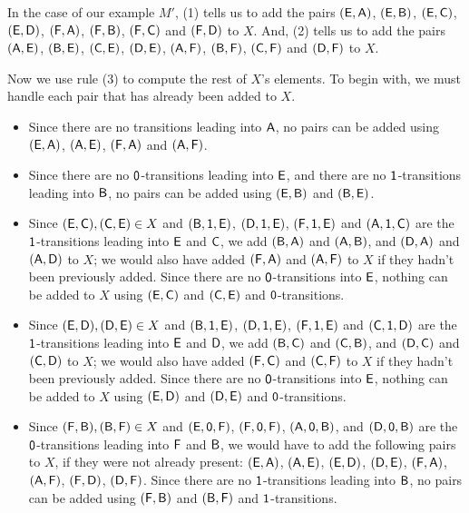 In the case of our example $M'$, (1) tells us to add the pairs
$(\mathsf{E},\mathsf{A})$, $(\mathsf{E},\mathsf{B})$, $(\mathsf{E},\mathsf{C})$, $(\mathsf{E},\mathsf{D})$,
$(\mathsf{F},\mathsf{A})$, $(\mathsf{F},\mathsf{B})$, $(\mathsf{F},\mathsf{C})$ and $(\mathsf{F},\mathsf{D})$ to $X$.
And, (2) tells us to add the pairs $(\mathsf{A},\mathsf{E})$, $(\mathsf{B},\mathsf{E})$,
$(\mathsf{C},\mathsf{E})$, $(\mathsf{D},\mathsf{E})$, $(\mathsf{A},\mathsf{F})$, $(\mathsf{B},\mathsf{F})$,
$(\mathsf{C},\mathsf{F})$ and $(\mathsf{D},\mathsf{F})$ to $X$.

Now we use rule (3) to compute the rest of $X$'s elements.  To begin
with, we must handle each pair that has already been added to $X$.
\begin{itemize}
\item Since there are no transitions leading into $\mathsf{A}$, no pairs can
  be added using $(\mathsf{E},\mathsf{A})$, $(\mathsf{A},\mathsf{E})$, $(\mathsf{F},\mathsf{A})$ and
  $(\mathsf{A},\mathsf{F})$.

\item Since there are no $\mathsf{0}$-transitions leading into $\mathsf{E}$,
  and there are no $\mathsf{1}$-transitions leading into $\mathsf{B}$, no pairs
  can be added using $(\mathsf{E},\mathsf{B})$ and $(\mathsf{B},\mathsf{E})$.

\item Since $(\mathsf{E},\mathsf{C}),(\mathsf{C},\mathsf{E})\in X$ and $(\mathsf{B},\mathsf{1},\mathsf{E})$,
  $(\mathsf{D},\mathsf{1},\mathsf{E})$, $(\mathsf{F},\mathsf{1},\mathsf{E})$ and $(\mathsf{A},\mathsf{1},\mathsf{C})$
  are the $\mathsf{1}$-transitions leading into $\mathsf{E}$ and $\mathsf{C}$, we add
  {$(\mathsf{B},\mathsf{A})$ and $(\mathsf{A},\mathsf{B})$, and $(\mathsf{D},\mathsf{A})$ and
    $(\mathsf{A},\mathsf{D})$} to $X$; {we would also have added $(\mathsf{F},\mathsf{A})$ and
    $(\mathsf{A},\mathsf{F})$ to $X$ if they hadn't been previously added.}  Since
  there are no $\mathsf{0}$-transitions into $\mathsf{E}$, nothing can be added
  to $X$ using $(\mathsf{E},\mathsf{C})$ and $(\mathsf{C},\mathsf{E})$ and
  $\mathsf{0}$-transitions.

\item Since $(\mathsf{E},\mathsf{D}),(\mathsf{D},\mathsf{E})\in X$ and $(\mathsf{B},\mathsf{1},\mathsf{E})$,
  $(\mathsf{D},\mathsf{1},\mathsf{E})$, $(\mathsf{F},\mathsf{1},\mathsf{E})$ and $(\mathsf{C},\mathsf{1},\mathsf{D})$
  are the $\mathsf{1}$-transitions leading into $\mathsf{E}$ and $\mathsf{D}$, we add
  {$(\mathsf{B},\mathsf{C})$ and $(\mathsf{C},\mathsf{B})$, and $(\mathsf{D},\mathsf{C})$ and
    $(\mathsf{C},\mathsf{D})$} to $X$; { we would also have added $(\mathsf{F},\mathsf{C})$
    and $(\mathsf{C},\mathsf{F})$ to $X$ if they hadn't been previously added.}
  Since there are no $\mathsf{0}$-transitions into $\mathsf{E}$, nothing can be
  added to $X$ using $(\mathsf{E},\mathsf{D})$ and $(\mathsf{D},\mathsf{E})$ and
  $\mathsf{0}$-transitions.

\item Since $(\mathsf{F},\mathsf{B}),(\mathsf{B},\mathsf{F})\in X$ and $(\mathsf{E},\mathsf{0},\mathsf{F})$,
  $(\mathsf{F},\mathsf{0},\mathsf{F})$, $(\mathsf{A},\mathsf{0},\mathsf{B})$, and
  $(\mathsf{D},\mathsf{0},\mathsf{B})$ are the $\mathsf{0}$-transitions leading into
  $\mathsf{F}$ and $\mathsf{B}$, we would have to add the following pairs to $X$,
  if they were not already present: $(\mathsf{E},\mathsf{A})$, $(\mathsf{A},\mathsf{E})$,
  $(\mathsf{E},\mathsf{D})$, $(\mathsf{D},\mathsf{E})$, $(\mathsf{F},\mathsf{A})$, $(\mathsf{A},\mathsf{F})$,
  $(\mathsf{F},\mathsf{D})$, $(\mathsf{D},\mathsf{F})$.  Since there are no
  $\mathsf{1}$-transitions leading into $\mathsf{B}$, no pairs can be added
  using $(\mathsf{F},\mathsf{B})$ and $(\mathsf{B},\mathsf{F})$ and $\mathsf{1}$-transitions.


\end{itemize}
